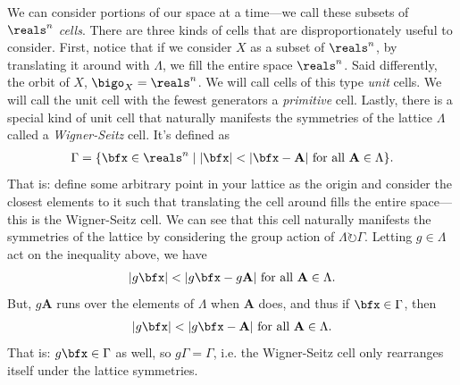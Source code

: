 \documentclass[11pt]{article}
\begin{document}
We can consider portions of our space at a time---we call these subsets of 
$\reals^n$ \emph{cells}. There are three kinds of cells that are disproportionately 
useful to consider. First, notice that if we consider $X$ as a subset of $\reals^n$, 
by translating it around with $\Lambda$, we fill the entire space $\reals^n$. Said
differently, the orbit of $X$, $\bigo_X = \reals^n$. We will call
cells of this type \emph{unit} cells. We will call the unit cell with the fewest
generators a \emph{primitive} cell. Lastly, there is a special kind of unit
cell that naturally manifests the symmetries of the lattice $\Lambda$
called a \emph{Wigner-Seitz} cell. It's defined as
\begin{align*}
    \Gamma = \{ \bfx \in \reals^n \mid |\bfx| < |\bfx - \mathbf{A}| \text{ for all } \mathbf{A} \in \Lambda \}.
\end{align*}
That is: define some arbitrary point in your lattice as the origin
and consider the closest elements to it such that translating the cell
around fills the entire space---this is the Wigner-Seitz cell.
We can see that this cell naturally manifests the symmetries of the
lattice by considering the group action of $\Lambda \circlearrowright \Gamma$.
Letting $g \in \Lambda$ act on the inequality above, we have
\begin{align*}
    |g\bfx| < |g\bfx - g \mathbf{A}| \text{ for all } \mathbf{A} \in \Lambda. 
\end{align*}
But, $g\mathbf{A}$ runs over the elements of $\Lambda$ when $\mathbf{A}$
does, and thus if $\bfx \in \Gamma$, then
\begin{align*}
    |g\bfx| < |g\bfx - \mathbf{A}| \text{ for all } \mathbf{A} \in \Lambda. 
\end{align*}
That is: $g\bfx \in \Gamma$ as well, so $g \Gamma = \Gamma$,
i.e. the Wigner-Seitz cell only rearranges itself under the
lattice symmetries.
\end{document}
